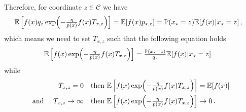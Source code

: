 \documentclass{article}
\theoremstyle{plain}
\theoremstyle{definition}
\theoremstyle{remark}
\newcommand{\E}{\mathbb E}
\newcommand{\PP}{\mathbb P}
\newcommand{\cC}{\mathcal C}
\theoremstyle{definition}
\begin{document}
Therefore, for coordinate $z \in \cC$ we have
\begin{align*}
    \E\left[
        f(x) q_z
        \exp\Bigl(- \tfrac{\eta}{p(x)} f(x) T_{x,z}\Bigr)
        \right]
     & =
    \E[f(x) p_{\star, z}]
    = \PP(x_\star = z) \E[f(x)| x_\star = z]\,,
\end{align*}
which means we need to set $T_{x,z}$ such that the following equation holds
\begin{align*}
    \E\left[
        f(x)
        \exp\Bigl(- \tfrac{\eta}{p(x)} f(x) T_{x,z}\Bigr)
        \right]
     & =
    \tfrac{\PP(x_\star = z)}{q_z} \E[f(x)| x_\star = z]\,
\end{align*}
while
\begin{align*}
    T_{x,z} = 0 \quad \text{then } \E\left[
        f(x)
        \exp\Bigl(- \tfrac{\eta}{p(x)} f(x) T_{x,z}\Bigr)
        \right]
     & = \E[f(x)]\, \\
    \text{and }\quad T_{x,z} \to \infty \quad \text{then } \E\left[
        f(x)
        \exp\Bigl(- \tfrac{\eta}{p(x)} f(x) T_{x,z}\Bigr)
        \right]
     & \to 0\,.
\end{align*}





\end{document}
